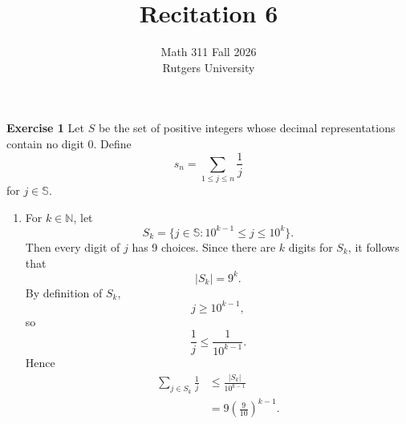 \documentclass[12pt]{article}
\title{Recitation 6}
\author{Math 311 Fall 2026 \\ Rutgers University}
\date{}
\begin{document}
\maketitle

\textbf{Exercise 1}
Let \( S \) be the set of positive integers whose
decimal representations contain no digit 0. Define
\[
    s_n = \sum_{1 \leq j \leq n} \frac{1}{j}
\]
for \( j \in \mathbb{S} \).
\begin{enumerate}[label=(\alph*)]
    \item For \( k \in \mathbb{N} \), let
          \[
              S_k = \{j \in \mathbb{S}: 10^{k-1} \leq  j \leq 10^k\}.
          \]
          Then every digit of \( j \) has 9 choices.
          Since there are \( k \) digits for \( S_{k} \), it follows that
          \[
              \vert S_k \vert = 9^k.
          \]
          By definition of \( S_k \),
          \[
              j \geq 10^{k-1},
          \]
          so
          \[
              \frac{1}{j} \leq \frac{1}{10^{k-1}}.
          \]
          Hence
          \[
              \begin{split}
                  \sum_{j \in S_k} \frac{1}{j} & \leq \frac{\vert S_k \vert }{10^{k-1}} \\
                                               & = 9 \left(\frac{9}{10}\right)^{k-1}.
              \end{split}
          \]


\end{enumerate}
\end{document}
